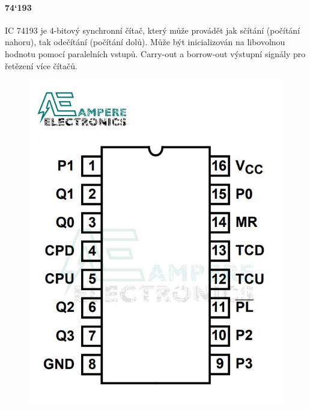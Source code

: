 \paragraph{74`193}
IC 74193 je 4-bitový synchronní čítač, který může provádět jak sčítání (počítání nahoru), tak odečítání (počítání dolů). Může být inicializován na libovolnou hodnotu pomocí paralelních vstupů. Carry-out a borrow-out výstupní signály pro řetězení více čítačů.
\begin{figure}[htbp]
\centering
\includegraphics[scale=0.2]{sections/3_pld_npld/images/74193.jpg}
\end{figure}



